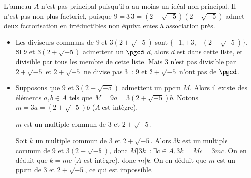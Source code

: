 {\begin{enumerate}
{L'anneau $A$ n'est pas principal puisqu'il a au moins un idéal non
principal. Il n'est pas non plus factoriel, puisque
$9=3\,3=(2+\sqrt{-5})(2-\sqrt{-5})$ admet deux factorisation en
irréductibles non équivalentes à association près.
\begin{itemize}
\item Les diviseurs communs de $9$ et $3(2+\sqrt{-5})$ sont $\{\pm1,\pm 3,
\pm(2+\sqrt{-5})\}$. Si $9$ et $3(2+\sqrt{-5})$ admettent un $\pgcd$ $d$,
alors $d$ est dans cette liste, et divisible par tous les membre de cette
liste. Mais $3$ n'est pas divisible par $2+\sqrt{-5}$ et $2+\sqrt{-5}$ ne
divise pas $3$~: $9$ et $2+\sqrt{-5}$ n'ont pas de $\pgcd$.
\item Supposons que $9$ et $3(2+\sqrt{-5})$ admettent un $\mathrm{ppcm}$ $M$. Alors il
existe des éléments $a,b\in A$ tels que $M=9a=3(2+\sqrt{-5})b$. Notons
$m=3a=(2+\sqrt{-5})b$ ($A$ est intègre).

$m$ est un multiple commun de $3$ et $2+\sqrt{-5}$.

Soit $k$ un multiple commun de $3$ et $2+\sqrt{-5}$. Alors $3k$ est un
multiple commun de $9$ et $3(2+\sqrt{-5})$, donc $M|3k$~: $\exists c\in
A, 3k=Mc=3mc$. On en déduit que $k=mc$ ($A$ est intègre), donc $m|k$. On
en déduit que $m$ est un $\mathrm{ppcm}$ de $3$ et $2+\sqrt{-5}$, ce qui est
impossible.
  \end{itemize}
}
\end{enumerate}
}
